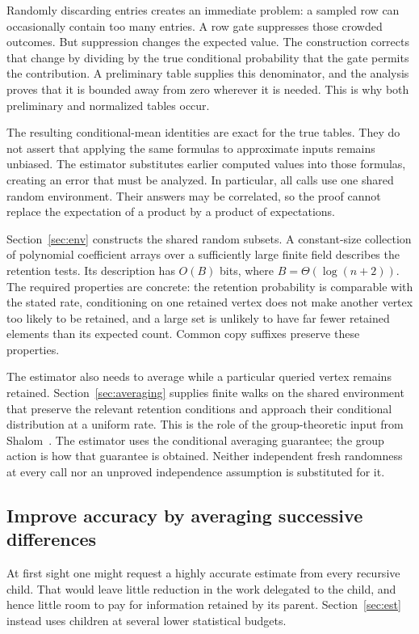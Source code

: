 Randomly discarding entries creates an immediate problem: a sampled row can occasionally contain too many entries. A row gate suppresses those crowded outcomes. But suppression changes the expected value. The construction corrects that change by dividing by the true conditional probability that the gate permits the contribution. A preliminary table supplies this denominator, and the analysis proves that it is bounded away from zero wherever it is needed. This is why both preliminary and normalized tables occur.

The resulting conditional-mean identities are exact for the true tables. They do not assert that applying the same formulas to approximate inputs remains unbiased. The estimator substitutes earlier computed values into those formulas, creating an error that must be analyzed. In particular, all calls use one shared random environment. Their answers may be correlated, so the proof cannot replace the expectation of a product by a product of expectations.

Section~\ref{sec:env} constructs the shared random subsets. A constant-size collection of polynomial coefficient arrays over a sufficiently large finite field describes the retention tests. Its description has $O(B)$ bits, where $B=\Theta(\log(n+2))$. The required properties are concrete: the retention probability is comparable with the stated rate, conditioning on one retained vertex does not make another vertex too likely to be retained, and a large set is unlikely to have far fewer retained elements than its expected count. Common copy suffixes preserve these properties.

The estimator also needs to average while a particular queried vertex remains retained. Section~\ref{sec:averaging} supplies finite walks on the shared environment that preserve the relevant retention conditions and approach their conditional distribution at a uniform rate. This is the role of the group-theoretic input from Shalom~\cite{Shalom1999}. The estimator uses the conditional averaging guarantee; the group action is how that guarantee is obtained. Neither independent fresh randomness at every call nor an unproved independence assumption is substituted for it.

\subsection{Improve accuracy by averaging successive differences}

At first sight one might request a highly accurate estimate from every recursive child. That would leave little reduction in the work delegated to the child, and hence little room to pay for information retained by its parent. Section~\ref{sec:est} instead uses children at several lower statistical budgets.

